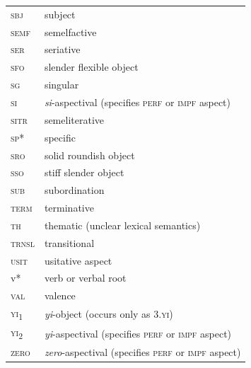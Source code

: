 \begin{tabularx}{.45\textwidth}{lQ}
\textsc{sbj} & subject\\
\textsc{semf} & semelfactive\\
\textsc{ser} & seriative\\
\textsc{sfo} & slender flexible object\\
\textsc{sg} & singular\\
\textsc{si} & \textit{si}-aspectival (specifies \textsc{perf} or \textsc{impf} aspect)\\
\textsc{sitr} & semeliterative\\
\textsc{sp*} & specific\\
\textsc{sro} & solid roundish object\\
\textsc{sso} & stiff slender object\\
\textsc{sub} & subordination\\
\textsc{term} & terminative\\
\textsc{th} & thematic (unclear lexical semantics)\\
\textsc{trnsl} & transitional\\
\textsc{usit} & usitative aspect\\
{v*} & verb or verbal root\\
\textsc{val} & valence\\
\textsc{yi}\textsubscript{1} & \textit{yi}-object (occurs only as \textsc{3}.\textsc{yi})\\
\textsc{yi}\textsubscript{2} & \textit{yi}-aspectival (specifies \textsc{perf} or \textsc{impf} aspect)\\
\textsc{zero} & \textit{zero}-aspectival (specifies \textsc{perf} or \textsc{impf} aspect)\\
\end{tabularx}
